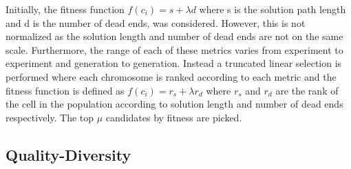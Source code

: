Initially, the fitness function $f(c_i) = s + \lambda d$ where s is the solution path length and d is the number of dead ends, was considered. However, this is not normalized as the solution length and number of dead ends are not on the same scale. Furthermore, the range of each of these metrics varies from experiment to experiment and generation to generation. Instead a truncated linear selection is performed where each chromosome is ranked according to each metric and the fitness function is defined as $f(c_i) = r_s + \lambda r_d$ where $r_s$ and $r_d$ are the rank of the cell in the population according to solution length and number of dead ends respectively. The top $\mu$ candidates by fitness are picked.

\subsection{Quality-Diversity}